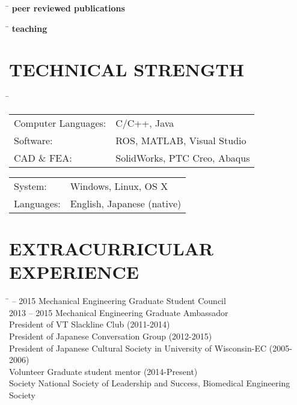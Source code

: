 \documentclass[11pt,letter]{article}
\begin{document}
\begin{tabbing}
	\hspace{3cm}\=\kill
	\>  {\bf peer reviewed publications}
\end{tabbing}

\begin{tabbing}
	\hspace{3cm}\=\kill
	\>  {\bf teaching}
\end{tabbing}

\section*{TECHNICAL STRENGTH}\vspace{-3mm}
\begin{tabbing}
	\hspace{0cm} \= \kill
	\> \begin{minipage}{0.56\columnwidth}
		\begin{tabular}{ll}
			Computer Languages:& C/C++, Java\\
			Software:& ROS, MATLAB, Visual Studio \\
			CAD \& FEA:& SolidWorks, PTC Creo, Abaqus\\
		\end{tabular}
	\end{minipage}
	\begin{minipage}{0.34\columnwidth}
		\begin{tabular}{ll}
			System: & Windows, Linux, OS X\\
			Languages: & English, Japanese (native)\\
		\end{tabular}
	\end{minipage}
\end{tabbing}



\section*{EXTRACURRICULAR EXPERIENCE}\vspace{-3mm}
\begin{tabbing}
	\hspace{3cm} \=  -- 2015 \> Mechanical Engineering Graduate Student Council\\
	2013 -- 2015 \> Mechanical Engineering Graduate Ambassador\\
	\> President of VT Slackline Club (2011-2014)\\
	\>	 President of Japanese Conversation Group (2012-2015)\\
	\>	 President of Japanese Cultural Society in University of Wisconsin-EC (2005-2006)\\
	\> Volunteer  Graduate student mentor (2014-Present)\\
	\> Society National Society of Leadership and Success, Biomedical Engineering Society
\end{tabbing}
\end{document}
